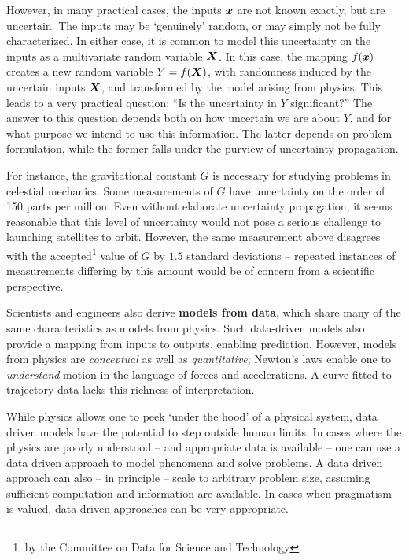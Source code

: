 \documentclass[../primer.tex]{subfiles}
\begin{document}
However, in many practical cases, the inputs $\boldsymbol{x}$ are not known exactly, but
are uncertain. The inputs may be `genuinely' random, or may simply not be fully
characterized. In either case, it is common to model this uncertainty on the
inputs as a multivariate random variable $\boldsymbol{X}$. In this case, the mapping
$f(\boldsymbol{x})$ creates a new random variable $Y = f(\boldsymbol{X})$, with randomness induced by
the uncertain inputs $\boldsymbol{X}$, and transformed by the model arising from physics.
This leads to a very practical question: ``Is the uncertainty in $Y$
significant?'' The answer to this question depends both on how uncertain we are
about $Y$, and for what purpose we intend to use this information. The latter
depends on problem formulation, while the former falls under the purview of
uncertainty propagation.

For instance, the gravitational constant $G$ is necessary for studying problems
in celestial mechanics. Some measurements of $G$ have uncertainty on the order
of 150 parts per million.\cite{rosi2014precision} Even without elaborate
uncertainty propagation, it seems reasonable that this level of uncertainty
would not pose a serious challenge to launching satellites to orbit. However,
the same measurement above disagrees with the accepted\footnote{by the Committee
  on Data for Science and Technology} value of $G$ by $1.5$ standard deviations
-- repeated instances of measurements differing by this amount would be of
concern from a scientific perspective.

Scientists and engineers also derive \textbf{models from data}, which share many
of the same characteristics as models from physics. Such data-driven models also
provide a mapping from inputs to outputs, enabling prediction. However, models
from physics are \emph{conceptual} as well as \emph{quantitative}; Newton's laws
enable one to \emph{understand} motion in the language of forces and
accelerations. A curve fitted to trajectory data lacks this richness of
interpretation.

While physics allows one to peek `under the hood' of a physical system, data
driven models have the potential to step outside human limits. In cases where
the physics are poorly understood -- and appropriate data is available -- one
can use a data driven approach to model phenomena and solve problems. A data
driven approach can also -- in principle -- scale to arbitrary problem size,
assuming sufficient computation and information are available. In cases when
pragmatism is valued, data driven approaches can be very appropriate.
\end{document}
